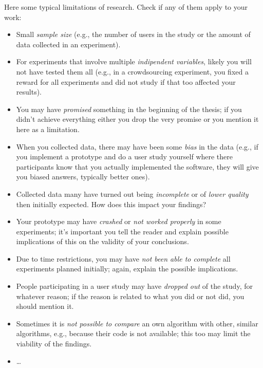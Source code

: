 Here some typical limitations of research. Check if any of them apply to your work:

\begin{itemize}
\item[\Square] Small \emph{sample size} (e.g., the number of users in the study or the amount of data collected in an experiment).
\item[\Square] For experiments that involve multiple \emph{indipendent variables}, likely you will not have tested them all (e.g., in a crowdsourcing experiment, you fixed a reward for all experiments and did not study if that too affected your results). 
\item[\Square] You may have \emph{promised} something in the beginning of the thesis; if you didn't achieve everything either you drop the very promise or you mention it here as a limitation.
\item[\Square] When you collected data, there may have been some \emph{bias} in the data (e.g., if you implement a prototype and do a user study yourself where there participants know that you actually implemented the software, they will give you biased answers, typically better ones).
\item[\Square] Collected data many have turned out being \emph{incomplete} or of  \emph{lower quality} then initially expected. How does this impact your findings?
\item[\Square] Your prototype may have \emph{crashed} or \emph{not worked properly} in some experiments; it's important you tell the reader and explain possible implications of this on the validity of your conclusions.
\item[\Square] Due to time restrictions, you may have \emph{not been able to complete} all experiments planned initially; again, explain the possible implications.
\item[\Square] People participating in a user study may have \emph{dropped out} of the study, for whatever reason; if the reason is related to what you did or not did, you should mention it.
\item[\Square] Sometimes it is \emph{not possible to compare} an own algorithm with other, similar algorithms, e.g., because their code is not available; this too may limit the viability of the findings.
\item[\Square] \dots
\end{itemize}



